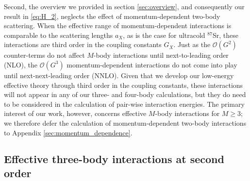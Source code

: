 \documentclass[preprint,showkeys,nofootinbib]{revtex4-1}
\newcommand{\p}[1]{\left(#1\right)} %
\renewcommand{\O}{\mathcal{O}}
\newcommand{\1}{\mathds{1}}
\begin{document}
Second, the overview we provided in section \ref{sec:overview}, and
consequently our result in \eqref{eq:H_2}, neglects the effect of
momentum-dependent two-body scattering.  When the effective range of
momentum-dependent interactions is comparable to the scattering
lengths $a_X$, as is the case for ultracold ${}^{87}$Sr, these
interactions are third order in the coupling constants $G_X$.  Just as
the $\O\p{G^2}$ counter-terms do not affect $M$-body interactions
until next-to-leading order (NLO), the $\O\p{G^3}$ momentum-dependent
interactions do not come into play until next-next-leading order
(NNLO).  Given that we develop our low-energy effective theory through
third order in the coupling constants, these interactions will not
appear in any of our three- and four-body calculations, but they do
need to be considered in the calculation of pair-wise interaction
energies.  The primary interest of our work, however, concerns
effective $M$-body interactions for $M\ge3$; we therefore defer the
calculation of momentum-dependent two-body interactions to Appendix
\ref{sec:momentum_dependence}.

\subsection{Effective three-body interactions at second order}
\end{document}

